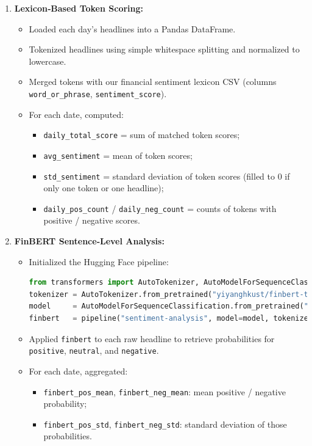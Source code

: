 \documentclass[11pt,a4paper]{article}
\begin{document}
\begin{enumerate}
  \item \textbf{Lexicon‐Based Token Scoring:}
  \begin{itemize}
    \item Loaded each day's headlines into a Pandas DataFrame.
    \item Tokenized headlines using simple whitespace splitting and normalized to lowercase.
    \item Merged tokens with our financial sentiment lexicon CSV (columns \texttt{word\_or\_phrase}, \texttt{sentiment\_score}).
    \item For each date, computed:
      \begin{itemize}
        \item \texttt{daily\_total\_score} = sum of matched token scores;
        \item \texttt{avg\_sentiment} = mean of token scores;
        \item \texttt{std\_sentiment} = standard deviation of token scores (filled to 0 if only one token or one headline);
        \item \texttt{daily\_pos\_count} / \texttt{daily\_neg\_count} = counts of tokens with positive / negative scores.
      \end{itemize}
  \end{itemize}

  \item \textbf{FinBERT Sentence‐Level Analysis:}
  \begin{itemize}
    \item Initialized the Hugging Face pipeline:
      \begin{lstlisting}[language=python]
from transformers import AutoTokenizer, AutoModelForSequenceClassification, pipeline
tokenizer = AutoTokenizer.from_pretrained("yiyanghkust/finbert-tone")
model     = AutoModelForSequenceClassification.from_pretrained("yiyanghkust/finbert-tone")
finbert   = pipeline("sentiment-analysis", model=model, tokenizer=tokenizer, return_all_scores=True)
      \end{lstlisting}
    \item Applied \texttt{finbert} to each raw headline to retrieve probabilities for \texttt{positive}, \texttt{neutral}, and \texttt{negative}.
    \item For each date, aggregated:
      \begin{itemize}
        \item \texttt{finbert\_pos\_mean}, \texttt{finbert\_neg\_mean}: mean positive / negative probability;
        \item \texttt{finbert\_pos\_std},  \texttt{finbert\_neg\_std}: standard deviation of those probabilities.
      \end{itemize}
  \end{itemize}
\end{enumerate}
\end{document}

